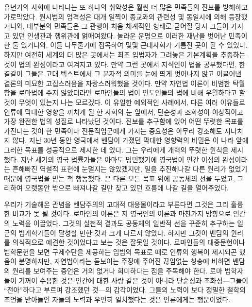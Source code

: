 유년기의 사회에 나타나는 또 하나의 취약성은 훨씬 더 많은 민족들의 진보를
방해하고 가로막았다.
원시법의 엄격성은 대개 일찍이 종교와의 관련성 및 동일시에 의해 등장했거니와,
대부분의 민족들은 그 관행이 처음 체계적인 형태로 굳어질 당시 그들이
가지고 있던 인생관과 행위관에 얽매여왔다.
놀라운 운명으로 이러한 재난을 벗어난 민족이 한 둘 있거니와,
이들 나무줄기에 접목하여 몇몇 근대사회가 기름진 곳이 될 수 있었다.
하지만 여전히 세계의 더 많은 곳에서는 최초 입법자가 그려놓은 기본계획을
추종하는 것이 법의 완성이라고 여겨지고 있다.
만약 그런 곳에서 지식인이 법을 공부했다면, 한결같이 그들은
고대 텍스트에서 그 문자적 의미를 눈에 띄게 벗어나지 않고 이끌어낸 결론의
미묘한 고집스러움을 자랑스러워했을 것이다.
만약 자연법 이론이 비범한 탁월함을 로마법에 주지 않았더라면
로마인들의 법이 인도인들의 법에 비해 우월하다고 할 것이
무엇이 있는지 나는 모르겠다.
이 유일한 예외적인 사례에서, 다른 여러 이유들로 인류에 막대한 영향을 끼치게 될
한 사회의 눈 앞에서, 단순성과 조화성이 이상적이고 가장 완전한 법의 성질로
나타났던 것이다.
진보를 추구함에 있어 어떤 뚜렷한 목표를 가진다는 것이
한 민족이나 전문직업군에게 가지는 중요성은 아무리 강조해도 지나치지 않다.
지난 30년 동안 영국에서 벤담이 가졌던 막대한 영향력의 비밀은
이 나라 앞에 그러한 목표를 성공적으로 제시한 데 있다.
그는 우리에게 개혁의 뚜렷한 원칙을 제시했다.
지난 세기의 영국 법률가들은 아마도 명민했기에
영국법이 인간 이성의 완성이라는 흔해빠진 역설적 표현에 눈멀지는 않았겠지만,
일을 추진해나갈 다른 원리가 없었기 때문에 영국법을 믿는 척 행동했다.
은 다른 모든 목표 위에 공동체의 선을 두었고,
그리하여 오랫동안 밖으로 빠져나갈 길만 찾고 있던 흐름에 나갈 길을 열어주었다.

우리가 기술해온 관념을 벤담주의의 고대적 대응물이라고 부른다면
그것은 그리 훌륭한 비교가 못 될 것이다.
로마인의 이론은 저 영국인의 이론과 마찬가지 방향으로 인간의 노력을 이끌었다.
그것의 실천적 결과도 공동체의 일반적 선을 꾸준히 추구하는
일군의 법개혁가들이 달성할 만한 것과 크게 다르지 않았다.
하지만 그것이 벤담의 원리를
의식적으로 예견한 것이었다고 보는 것은 잘못일 것이다.
로마인들의 대중문헌이나 법학문헌을 보면
구제수단을 제공하는 입법의 목표로
때로 인류의 행복이 제시되곤 했음이 분명하지만,
자연법이라는 돋보이는 주장에 주어진 끊임없는 칭송에 비하면
벤담의 원리를 보여주는 증언은 거의 없거나 희미하다는 점을
주목해야 한다.
로마 법학자들이 기꺼이 수용한 것은 인간에 대한 사랑 같은 것이 아니라
단순성과 조화성---그들이 ``전아''하다고 부르며
강조했던 것---의 감각이었다.
그들의 노력이 보다 정밀한 철학의 조언을 받아들인 자들의 노력과
우연히 일치했다는 것은 인류에게는 행운이었다.

